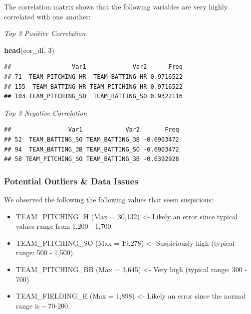\documentclass[
]{article}
\newenvironment{Shaded}{\begin{snugshade}}{\end{snugshade}}
\newcommand{\DecValTok}[1]{\textcolor[rgb]{0.00,0.00,0.81}{#1}}
\newcommand{\FunctionTok}[1]{\textcolor[rgb]{0.13,0.29,0.53}{\textbf{#1}}}
\newcommand{\NormalTok}[1]{#1}
\newcommand{\SpecialCharTok}[1]{\textcolor[rgb]{0.81,0.36,0.00}{\textbf{#1}}}
\providecommand{\tightlist}{%
  \setlength{\itemsep}{0pt}\setlength{\parskip}{0pt}}
\begin{document}
The correlation matrix shows that the following variables are very
highly correlated with one another:

\emph{Top 3 Positive Correlation}

\begin{Shaded}
\begin{Highlighting}[]
\FunctionTok{head}\NormalTok{(cor\_df, }\DecValTok{3}\NormalTok{)}
\end{Highlighting}
\end{Shaded}

\begin{verbatim}
##                 Var1             Var2      Freq
## 71  TEAM_PITCHING_HR  TEAM_BATTING_HR 0.9716522
## 155  TEAM_BATTING_HR TEAM_PITCHING_HR 0.9716522
## 103 TEAM_PITCHING_SO  TEAM_BATTING_SO 0.9322116
\end{verbatim}

\emph{Top 3 Negative Correlation}

\begin{Shaded}
\end{Shaded}

\begin{verbatim}
##                Var1            Var2       Freq
## 52  TEAM_BATTING_SO TEAM_BATTING_3B -0.6903472
## 94  TEAM_BATTING_3B TEAM_BATTING_SO -0.6903472
## 58 TEAM_PITCHING_SO TEAM_BATTING_3B -0.6392928
\end{verbatim}

\subsubsection{Potential Outliers \& Data
Issues}\label{potential-outliers-data-issues}

We observed the following the following values that seem suspicious:

\begin{itemize}
\tightlist
\item
  TEAM\_PITCHING\_H (Max = 30,132) \textless- Likely an error since
  typical values range from 1,200 - 1,700.
\item
  TEAM\_PITCHING\_SO (Max = 19,278) \textless- Suspiciously high
  (typical range: 500 - 1,500).
\item
  TEAM\_PITCHING\_BB (Max = 3,645) \textless- Very high (typical range:
  300 - 700).
\item
  TEAM\_FIELDING\_E (Max = 1,898) \textless- Likely an error since the
  normal range is \textasciitilde{} 70-200.
\end{itemize}
\end{document}
